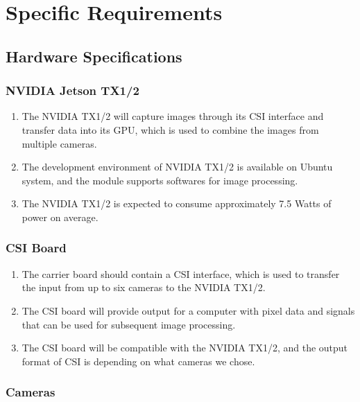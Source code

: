 \documentclass[letterpaper,10pt,serif,draftclsnofoot,onecolumn,compsoc,titlepage]{IEEEtran}
\begin{document}
\section{Specific Requirements}

\subsection{Hardware Specifications}

\subsubsection{NVIDIA Jetson TX1/2}

\begin{enumerate}[label=\alph*]
	\item The NVIDIA TX1/2 will capture images through its CSI interface and transfer data 
	into its GPU, which is used to combine the images from multiple cameras.\\ 
	\item The development environment of NVIDIA TX1/2 is available on Ubuntu system, and the 
	module supports softwares for image processing.\\
	\item The NVIDIA TX1/2 is expected to consume approximately 7.5 Watts of power on 
	average.\\
\end{enumerate}

\subsubsection{CSI Board}

\begin{enumerate}[label=\alph*]
	\item The carrier board should contain a CSI interface, which is used to transfer the
	input from up to six cameras to the NVIDIA TX1/2. \\
	\item The CSI board will provide output for a computer with pixel data and signals that 
	can be used for subsequent image processing.\\
	\item The CSI board will be compatible with the NVIDIA TX1/2, and the output format of 
	CSI is depending on what cameras we chose.\\
\end{enumerate}

\subsubsection{Cameras}
\end{document}

